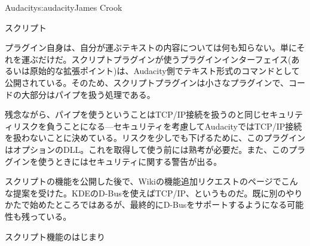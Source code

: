 \begin{aosachapter}{Audacity}{s:audacity}{James Crook}
\begin{aosasect1}{スクリプト}

プラグイン自身は、自分が運ぶテキストの内容については何も知らない。単にそれを運ぶだけだ。スクリプトプラグインが使うプラグインインターフェイス(あるいは原始的な拡張ポイント)は、Audacity側でテキスト形式のコマンドとして公開されている。そのため、スクリプトプラグインは小さなプラグインで、コードの大部分はパイプを扱う処理である。

残念ながら、パイプを使うということはTCP/IP接続を扱うのと同じセキュリティリスクを負うことになる---セキュリティを考慮してAudacityではTCP/IP接続を扱わないことに決めている。リスクを少しでも下げるために、このプラグインはオプションのDLL。これを取得して使う前には熟考が必要だ。また、このプラグインを使うときにはセキュリティに関する警告が出る。

スクリプトの機能を公開した後で、Wikiの機能追加リクエストのページでこんな提案を受けた。KDEのD-Busを使えばTCP/IP、というものだ。既に別のやりかたで始めたところではあるが、最終的にD-Busをサポートするようになる可能性も残っている。

\begin{aosabox}{スクリプト機能のはじまり}


\end{aosabox}
\end{aosasect1}
\end{aosachapter}
